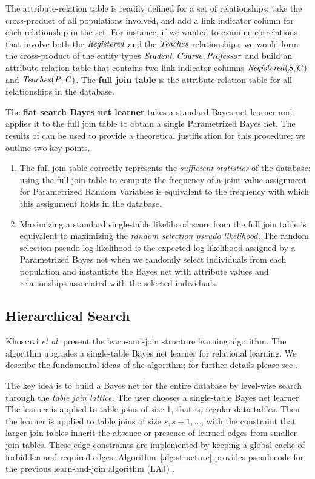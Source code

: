 \documentclass[runningheads,a4paper]{llncs}
\begin{document}
The attribute-relation table is readily defined for a set of relationships: take the cross-product of all populations involved, and add a link indicator column for each relationship in the set.
For instance, if we wanted to examine correlations that involve both the $\mathit{Registered}$ and the $\it{Teaches}$ relationships, we would form the cross-product of the entity types $\it{Student},\it{Course},\it{Professor}$ and build an attribute-relation table that contains two link indicator columns $\mathit{Registered}(S,C)$ and $\it{Teaches}(P,C)$. 
The \textbf{full join table} is the attribute-relation table for all relationships in the database.
 
The \textbf{flat search Bayes net learner} takes a standard Bayes net learner and applies it to the full join table to obtain a single Parametrized Bayes net.
 The results of \cite{Schulte2011} can be used to provide a theoretical justification for this procedure;
 we outline two key points. \begin{enumerate} \item The full join table correctly represents the {\em sufficient statistics}\cite{Heckerman1995,Schulte2011} of the database: 
using the full join table to compute the frequency of a joint value assignment for Parametrized Random Variables is equivalent to the frequency with which this assignment holds in the database. 
\item Maximizing a standard single-table likelihood score from the full join table is equivalent to maximizing the {\em random selection pseudo likelihood.} 
The random selection pseudo log-likelihood is the expected log-likelihood assigned by a Parametrized Bayes net when we randomly select individuals from each population and instantiate the Bayes net with attribute values and relationships associated with the selected individuals. 
\end{enumerate}

\subsection{Hierarchical Search}
Khosravi {\em et al.} \cite{Schulte2012} present the learn-and-join  structure learning algorithm. 
The algorithm upgrades a single-table Bayes net learner for relational learning. 
We describe the fundamental ideas of the algorithm; for further details please see \cite{Schulte2012}. 
 
The key idea is to build a Bayes net for the entire database by level-wise search through the {\em table join lattice.} The user chooses a single-table Bayes net learner. The learner is applied to table joins of size 1, that is, regular data tables. Then the learner is applied to table joins of size $s,s+1,\ldots$, with the constraint that larger join tables inherit the absence or presence of learned edges from smaller join tables. These edge constraints are implemented by keeping a global cache of forbidden and required edges.  Algorithm~\ref{alg:structure} provides pseudocode for the previous learn-and-join algorithm (LAJ) \cite{Schulte2012c}. 
\end{document}
